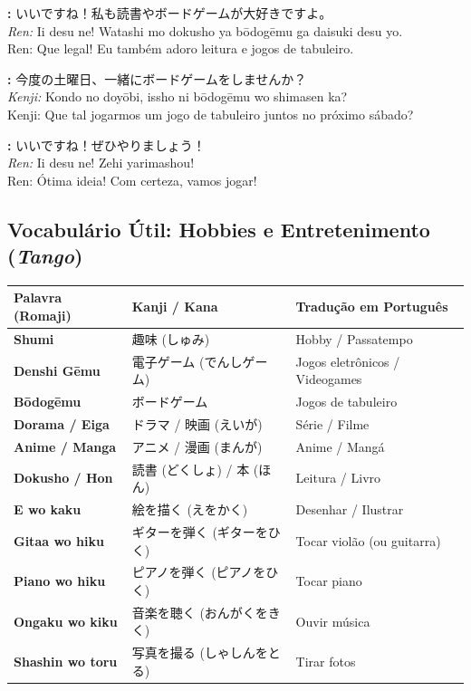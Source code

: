 \documentclass[12pt,a4paper]{article}
\begin{document}
\textbf{:} いいですね！私も読書やボードゲームが大好きですよ。\\
\textit{Ren:} Ii desu ne! Watashi mo dokusho ya bōdogēmu ga daisuki desu yo.\\
Ren: Que legal! Eu também adoro leitura e jogos de tabuleiro.

\vspace{0.4em}

\textbf{:} 今度の土曜日、一緒にボードゲームをしませんか？\\
\textit{Kenji:} Kondo no doyōbi, issho ni bōdogēmu wo shimasen ka?\\
Kenji: Que tal jogarmos um jogo de tabuleiro juntos no próximo sábado?

\vspace{0.4em}

\textbf{:} いいですね！ぜひやりましょう！\\
\textit{Ren:} Ii desu ne! Zehi yarimashou!\\
Ren: Ótima ideia! Com certeza, vamos jogar!

\newpage

\subsection*{Vocabulário Útil: Hobbies e Entretenimento (\textit{Tango})}

\vspace{0.2cm}

\noindent
\small
\begin{tabularx}{\textwidth}{>{\bfseries\color{jpnavy}}l X X}
\toprule
Palavra (Romaji) & Kanji / Kana & Tradução em Português \\
\midrule
Shumi & 趣味 (しゅみ) & Hobby / Passatempo \\
Denshi Gēmu & 電子ゲーム (でんしゲーム) & Jogos eletrônicos / Videogames \\
Bōdogēmu & ボードゲーム & Jogos de tabuleiro \\
Dorama / Eiga & ドラマ / 映画 (えいが) & Série / Filme \\
Anime / Manga & アニメ / 漫画 (まんが) & Anime / Mangá \\
Dokusho / Hon & 読書 (どくしょ) / 本 (ほん) & Leitura / Livro \\
\midrule
E wo kaku & 絵を描く (えをかく) & Desenhar / Ilustrar \\
Gitaa wo hiku & ギターを弾く (ギターをひく) & Tocar violão (ou guitarra) \\
Piano wo hiku & ピアノを弾く (ピアノをひく) & Tocar piano \\
Ongaku wo kiku & 音楽を聴く (おんがくをきく) & Ouvir música \\
Shashin wo toru & 写真を撮る (しゃしんをとる) & Tirar fotos \\
\bottomrule
\end{tabularx}
\end{document}
